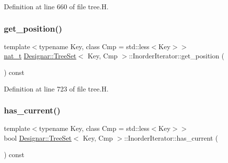 Definition at line 660 of file tree.\+H.

\mbox{\label{class_designar_1_1_tree_set_1_1_inorder_iterator_a32fceb8d4318ee6c11c07c1b02b93635}} 
\subsubsection{\texorpdfstring{get\+\_\+position()}{get\_position()}}
{\footnotesize\ttfamily template$<$typename Key, class Cmp = std\+::less$<$\+Key$>$$>$ \\
\hyperlink{namespace_designar_aa72662848b9f4815e7bf31a7cf3e33d1}{nat\+\_\+t} \hyperlink{class_designar_1_1_tree_set}{Designar\+::\+Tree\+Set}$<$ Key, Cmp $>$\+::Inorder\+Iterator\+::get\+\_\+position (\begin{DoxyParamCaption}{ }\end{DoxyParamCaption}) const\hspace{0.3cm}{\ttfamily [inline]}}



Definition at line 723 of file tree.\+H.

\mbox{\label{class_designar_1_1_tree_set_1_1_inorder_iterator_ae83dae23b6d48b2ccec38c7e22d01fd0}} 
\subsubsection{\texorpdfstring{has\+\_\+current()}{has\_current()}}
{\footnotesize\ttfamily template$<$typename Key, class Cmp = std\+::less$<$\+Key$>$$>$ \\
bool \hyperlink{class_designar_1_1_tree_set}{Designar\+::\+Tree\+Set}$<$ Key, Cmp $>$\+::Inorder\+Iterator\+::has\+\_\+current (\begin{DoxyParamCaption}{ }\end{DoxyParamCaption}) const\hspace{0.3cm}{\ttfamily [inline]}}



